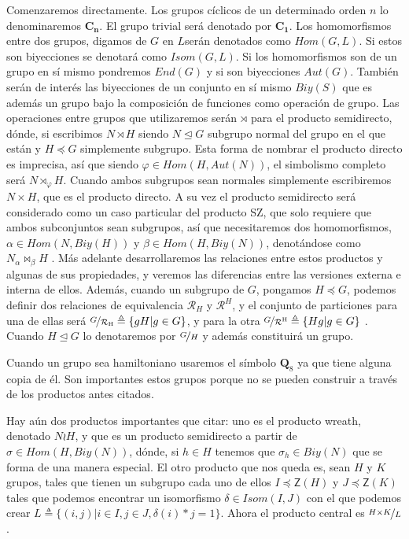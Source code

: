 \documentclass[12pt,a4paper,fleqn,spanish,final,openright]{extbook}
\theoremstyle{definition}
\theoremstyle{remark}
\theoremstyle{proof}
\begin{document}
Comenzaremos directamente. Los grupos cíclicos de un determinado orden
$n$ lo denominaremos $\mathbf{C_{n}}$. El grupo trivial será denotado
por $\mathbf{C_1}$. Los homomorfismos entre dos grupos, digamos
de $G$ en $L$serán denotados como $Hom(G,L)$. Si estos son biyecciones
se denotará como $Isom(G,L)$. Si los homomorfismos son de un grupo
en sí mismo pondremos $End(G)$ y si son biyecciones $Aut(G)$. También
serán de interés las biyecciones de un conjunto en sí mismo $Biy(S)$
que es además un grupo bajo la composición de funciones como operación
de grupo. Las operaciones entre grupos que utilizaremos serán $\rtimes$
para el producto semidirecto, dónde, si escribimos $N\rtimes H$ siendo
$N \trianglelefteq G$ subgrupo normal del grupo en el que están y
$H     \preccurlyeq      G$ simplemente subgrupo. Esta forma de nombrar el
producto directo es imprecisa, así que siendo $\varphi     \in Hom(H,Aut(N))$,
el simbolismo completo será $N\rtimes_{\varphi }H$. Cuando ambos subgrupos
sean normales simplemente escribiremos $N     \times      H$, que es el producto
directo. A su vez el producto semidirecto será considerado como un
caso particular del producto SZ, que solo requiere que ambos subconjuntos
sean subgrupos, así que necesitaremos dos homomorfismos, $\alpha     \in Hom(N,Biy(H))$
y $\beta     \in Hom(H,Biy(N))$, denotándose como $N_{\alpha \!}\bowtie_{\beta }H$
. Más adelante desarrollaremos las relaciones entre estos productos
y algunas de sus propiedades, y veremos las diferencias entre las
versiones externa e interna de ellos. Además, cuando un subgrupo de
$G$, pongamos $H     \preccurlyeq      G$, podemos definir dos relaciones
de equivalencia $\mathcal{R}_{H}$ y $\mathcal{R}^{H}$, y el conjunto
de particiones para una de ellas será $\nicefrac{G}{{\mathcal{R}}_{\mathrm{H}}}\triangleq\lbrace gH |g     \in G\rbrace$,
y para la otra $\nicefrac{G}{{\mathcal{R}}^{\mathrm{H}}}\triangleq\lbrace Hg|g     \in G\rbrace$
. Cuando $H\trianglelefteq G$ lo denotaremos por $\nicefrac{G}{H}$
y además constituirá un grupo.

Cuando un grupo sea hamiltoniano usaremos el símbolo $\boldsymbol{Q}_{8}$ ya
que tiene alguna copia de él. Son importantes estos grupos porque
no se pueden construir a través de los productos antes citados.

Hay aún dos productos importantes que citar: uno es el producto wreath,
denotado $N\wr H$, y que es un producto semidirecto a partir de
$\sigma     \in Hom(H,Biy(N))$, dónde, si $h     \in H$ tenemos que $\sigma_{h}     \in Biy(N)$
que se forma de una manera especial. El otro producto que nos queda
es, sean $H$ y $K$ grupos, tales que tienen un subgrupo cada uno
de ellos $I     \preccurlyeq     \mathsf{Z}(H)$ y $J     \preccurlyeq     \mathsf{Z}(K)$
tales que podemos encontrar un isomorfismo $\delta     \in Isom(I,J)$
con el que podemos crear $L\triangleq\lbrace(i,j)|i     \in I,j     \in J,\delta (i)*j=1\rbrace$.
Ahora el producto central es $\nicefrac{H     \times      K}{L}$.
\end{document}
